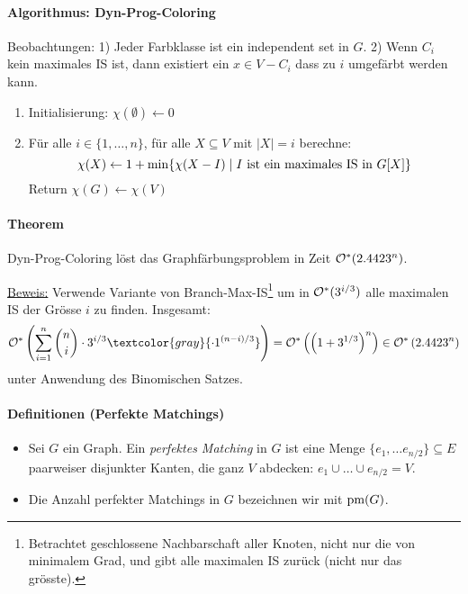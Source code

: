 \paragraph{Algorithmus: Dyn-Prog-Coloring}
Beobachtungen:
1) Jeder Farbklasse ist ein independent set in $G$.
2) Wenn $C_i$ kein maximales IS ist, dann existiert ein $x \in V-C_i$ dass zu $i$ umgefärbt werden kann.

\begin{enumerate}
    \item Initialisierung: $\chi(\emptyset) \leftarrow 0$
    \item Für alle $i \in \{1, \dots, n\}$, für alle $X \subseteq V$ mit $|X| = i$ berechne:
    $$ \chi(X) \leftarrow 1 + \min \{ \chi(X-I) \; | \; I \text{ ist ein maximales IS in } G[X] \} $$
    Return $\chi(G) \leftarrow \chi(V)$
\end{enumerate}

\paragraph{Theorem}
Dyn-Prog-Coloring löst das Graphfärbungsproblem in Zeit $\mathcal{O}^*(2.4423^n)$.

\underline{Beweis:}
Verwende Variante von Branch-Max-IS\footnote{Betrachtet geschlossene Nachbarschaft aller Knoten, nicht nur
die von minimalem Grad, und gibt alle maximalen IS zurück (nicht nur das grösste).} um in $\mathcal{O}^*(3^{i/3})$ alle maximalen IS der Grösse $i$ zu finden.
Insgesamt:
$$ \bigOstar \left(\sum_{i=1}^n \binom{n}{i} \cdot 3^{i/3} \textcolor{gray}{\cdot 1^{(n-i)/3}} \right)
= \bigOstar \left( \left(1+3^{1/3} \right)^n \right) \in \bigOstar \left(2.4423^n \right) $$
unter Anwendung des Binomischen Satzes.

\paragraph{Definitionen (Perfekte Matchings)}
\begin{itemize}
    \item Sei $G$ ein Graph. Ein \emph{perfektes Matching} in $G$ ist eine Menge $\{e_1, \dots e_{n/2}\} \subseteq E$
    paarweiser disjunkter Kanten, die ganz $V$ abdecken: $e_1 \cup \dots \cup e_{n/2} = V$.
    \item Die Anzahl perfekter Matchings in $G$ bezeichnen wir mit $\text{pm}(G)$.
\end{itemize}




